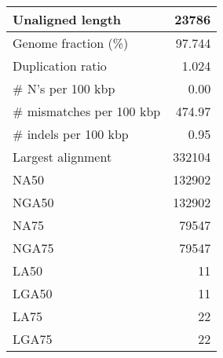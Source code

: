 \documentclass[12pt,a4paper]{article}
\begin{document}
\begin{table}[ht]
\begin{center}
\begin{tabular}{|l*{1}{|r}|}
Unaligned length & 23786 \\ \hline
Genome fraction (\%) & 97.744 \\ \hline
Duplication ratio & 1.024 \\ \hline
\# N's per 100 kbp & 0.00 \\ \hline
\# mismatches per 100 kbp & 474.97 \\ \hline
\# indels per 100 kbp & 0.95 \\ \hline
Largest alignment & 332104 \\ \hline
NA50 & 132902 \\ \hline
NGA50 & 132902 \\ \hline
NA75 & 79547 \\ \hline
NGA75 & 79547 \\ \hline
LA50 & 11 \\ \hline
LGA50 & 11 \\ \hline
LA75 & 22 \\ \hline
LGA75 & 22 \\ \hline
\end{tabular}
\end{center}
\end{table}
\end{document}
